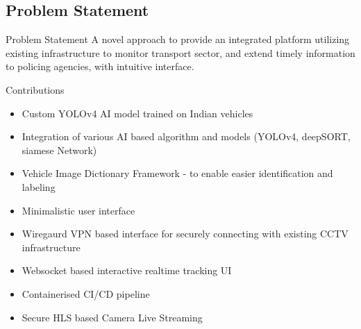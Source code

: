 \documentclass{beamer}
\begin{document}

	\subsection{Problem Statement}
	\begin{frame}{Problem Statement}
		A novel approach to provide an integrated platform utilizing existing infrastructure to monitor transport sector, and extend timely information to policing agencies, with intuitive interface.
	\end{frame}

	\begin{frame}{Contributions}
		\begin{itemize}
			\item Custom YOLOv4 AI model trained on Indian vehicles
			\item Integration of various AI based algorithm and models (YOLOv4, deepSORT, siamese Network)
   			\item Vehicle Image Dictionary Framework - to enable easier identification and labeling 
			\item Minimalistic user interface
			\item Wiregaurd VPN based interface for securely connecting with existing CCTV infrastructure
   			\item Websocket based interactive realtime tracking UI 
			\item Containerised CI/CD pipeline 
			\item Secure HLS based Camera Live Streaming
		\end{itemize}
	\end{frame}
	
\end{document}
